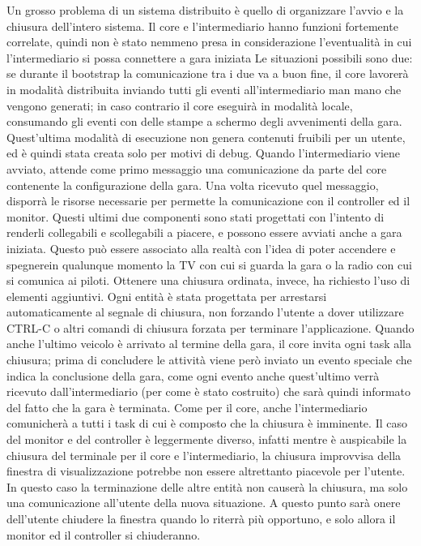 Un grosso problema di un sistema distribuito è quello di organizzare l’avvio e la chiusura dell’intero sistema.
Il core e l’intermediario hanno funzioni fortemente correlate, quindi non è stato nemmeno presa in considerazione l’eventualità in cui l’intermediario si possa connettere a gara iniziata
Le situazioni possibili sono due: se durante il bootstrap la comunicazione tra i due va a buon fine, il core lavorerà in modalità distribuita inviando tutti gli eventi all’intermediario man mano che vengono generati; in caso contrario il core eseguirà in modalità locale, consumando gli eventi con delle stampe a schermo degli avvenimenti della gara. Quest’ultima modalità di esecuzione non genera contenuti fruibili per un utente, ed è quindi stata creata solo per motivi di debug.
Quando l’intermediario viene avviato, attende come primo messaggio una comunicazione da parte del core contenente la configurazione della gara. Una volta ricevuto quel messaggio, disporrà le risorse necessarie per permette la comunicazione con il controller ed il monitor.
Questi ultimi due componenti sono stati progettati con l’intento di renderli collegabili e scollegabili a piacere, e possono essere avviati anche a gara iniziata. Questo può essere associato alla realtà con l’idea di poter accendere e spegnerein qualunque momento la TV con cui si guarda la gara o la radio con cui si comunica ai piloti.
Ottenere una chiusura ordinata, invece, ha richiesto l’uso di elementi aggiuntivi. Ogni entità è stata progettata per arrestarsi automaticamente al segnale di chiusura, non forzando l’utente a dover utilizzare CTRL-C o altri comandi di chiusura forzata per terminare l’applicazione.
Quando anche l’ultimo veicolo è arrivato al termine della gara, il core invita ogni task alla chiusura; prima di concludere le attività viene però inviato un evento speciale che indica la conclusione della gara, come ogni evento anche quest’ultimo verrà ricevuto dall’intermediario (per come è stato costruito) che sarà quindi informato del fatto che la gara è terminata. Come per il core, anche l’intermediario comunicherà a tutti i task di cui è composto che la chiusura è imminente.
Il caso del monitor e del controller è leggermente diverso, infatti mentre è auspicabile la chiusura del terminale per il core e l’intermediario, la chiusura improvvisa della finestra di visualizzazione potrebbe non essere altrettanto piacevole per l’utente. In questo caso la terminazione delle altre entità non causerà la chiusura, ma solo una comunicazione all’utente della nuova situazione. A questo punto sarà onere dell’utente chiudere la finestra quando lo riterrà più opportuno, e solo allora il monitor ed il controller si chiuderanno.